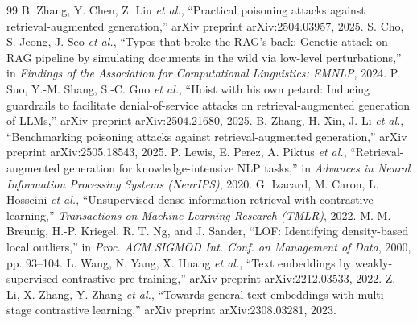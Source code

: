 \documentclass[10pt,journal,compsoc]{IEEEtran}
\begin{document}
\begin{thebibliography}{99}
 B. Zhang, Y. Chen, Z. Liu \emph{et al.}, ``Practical poisoning attacks against retrieval-augmented generation,'' arXiv preprint arXiv:2504.03957, 2025.
 S. Cho, S. Jeong, J. Seo \emph{et al.}, ``Typos that broke the RAG's back: Genetic attack on RAG pipeline by simulating documents in the wild via low-level perturbations,'' in \emph{Findings of the Association for Computational Linguistics: EMNLP}, 2024.
 P. Suo, Y.-M. Shang, S.-C. Guo \emph{et al.}, ``Hoist with his own petard: Inducing guardrails to facilitate denial-of-service attacks on retrieval-augmented generation of LLMs,'' arXiv preprint arXiv:2504.21680, 2025.
 B. Zhang, H. Xin, J. Li \emph{et al.}, ``Benchmarking poisoning attacks against retrieval-augmented generation,'' arXiv preprint arXiv:2505.18543, 2025.
 P. Lewis, E. Perez, A. Piktus \emph{et al.}, ``Retrieval-augmented generation for knowledge-intensive NLP tasks,'' in \emph{Advances in Neural Information Processing Systems (NeurIPS)}, 2020.
 G. Izacard, M. Caron, L. Hosseini \emph{et al.}, ``Unsupervised dense information retrieval with contrastive learning,'' \emph{Transactions on Machine Learning Research (TMLR)}, 2022.
 M. M. Breunig, H.-P. Kriegel, R. T. Ng, and J. Sander, ``LOF: Identifying density-based local outliers,'' in \emph{Proc. ACM SIGMOD Int. Conf. on Management of Data}, 2000, pp. 93--104.
 L. Wang, N. Yang, X. Huang \emph{et al.}, ``Text embeddings by weakly-supervised contrastive pre-training,'' arXiv preprint arXiv:2212.03533, 2022.
 Z. Li, X. Zhang, Y. Zhang \emph{et al.}, ``Towards general text embeddings with multi-stage contrastive learning,'' arXiv preprint arXiv:2308.03281, 2023.
\end{thebibliography}
\end{document}
